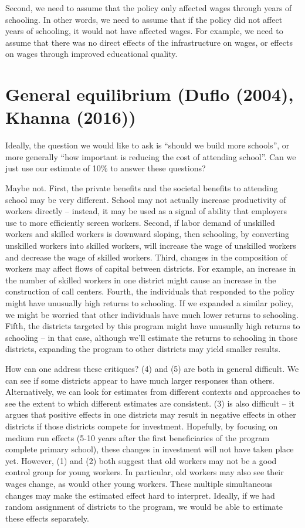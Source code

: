 \documentclass[12pt,english]{article}
\begin{document}
Second, we need to assume that the policy only affected wages through years of schooling. In other words, we need to assume that if the policy did not affect years of schooling, it would not have affected wages. For example, we need to assume that there was no direct effects of the infrastructure on wages, or effects on wages through improved educational quality.

\section{General equilibrium (Duflo (2004), Khanna (2016))}

Ideally, the question we would like to ask is ``should we build more schools'', or more generally ``how important is reducing the cost of attending school''. Can we just use our estimate of 10\% to answer these questions?

Maybe not. First, the private benefits and the societal benefits to attending school may be very different. School may not actually increase productivity of workers directly -- instead, it may be used as a signal of ability that employers use to more efficiently screen workers. Second, if labor demand of unskilled workers and skilled workers is downward sloping, then schooling, by converting unskilled workers into skilled workers, will increase the wage of unskilled workers and decrease the wage of skilled workers. Third, changes in the composition of workers may affect flows of capital between districts. For example, an increase in the number of skilled workers in one district might cause an increase in the construction of call centers. Fourth, the individuals that responded to the policy might have unusually high returns to schooling. If we expanded a similar policy, we might be worried that other individuals have much lower returns to schooling. Fifth, the districts targeted by this program might have unusually high returns to schooling -- in that case, although we'll estimate the returns to schooling in those districts, expanding the program to other districts may yield smaller results.

How can one address these critiques? (4) and (5) are both in general difficult. We can see if some districts appear to have much larger responses than others. Alternatively, we can look for estimates from different contexts and approaches to see the extent to which different estimates are consistent. (3) is also difficult -- it argues that positive effects in one districts may result in negative effects in other districts if those districts compete for investment. Hopefully, by focusing on medium run effects (5-10 years after the first beneficiaries of the program complete primary school), these changes in investment will not have taken place yet. However, (1) and (2) both suggest that old workers may not be a good control group for young workers. In particular, old workers may also see their wages change, as would other young workers. These multiple simultaneous changes may make the estimated effect hard to interpret. Ideally, if we had random assignment of districts to the program, we would be able to estimate these effects separately.
\end{document}

